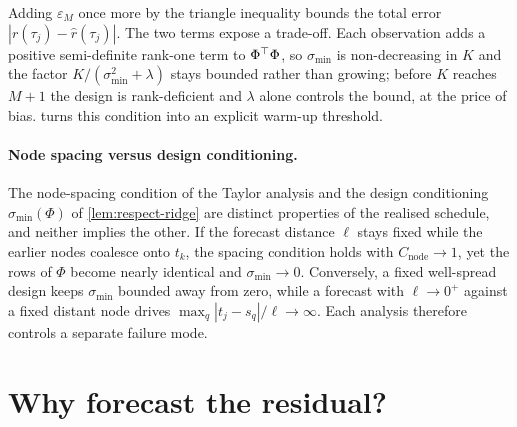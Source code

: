 Adding $\varepsilon_M$ once more by the triangle inequality bounds the total error $|r(\tau_j)-\hat r(\tau_j)|$. The two terms expose a trade-off. Each observation adds a positive semi-definite rank-one term to $\Phi^{\top}\Phi$, so $\sigma_{\min}$ is non-decreasing in $K$ and the factor $K/(\sigma_{\min}^2+\lambda)$ stays bounded rather than growing; before $K$ reaches $M{+}1$ the design is rank-deficient and $\lambda$ alone controls the bound, at the price of bias.  turns this condition into an explicit warm-up threshold.

\paragraph{Node spacing versus design conditioning.} The node-spacing condition of the Taylor analysis and the design conditioning $\sigma_{\min}(\Phi)$ of \cref{lem:respect-ridge} are distinct properties of the realised schedule, and neither implies the other. If the forecast distance $\ell$ stays fixed while the earlier nodes coalesce onto $t_k$, the spacing condition holds with $C_{\mathrm{node}}\to1$, yet the rows of $\Phi$ become nearly identical and $\sigma_{\min}\to0$. Conversely, a fixed well-spread design keeps $\sigma_{\min}$ bounded away from zero, while a forecast with $\ell\to0^+$ against a fixed distant node drives $\max_q|t_j-s_q|/\ell\to\infty$. Each analysis therefore controls a separate failure mode.

\section{Why forecast the residual?}\label{sec:respect-residual-space}

